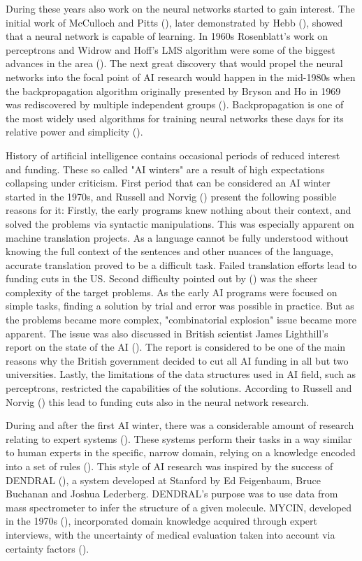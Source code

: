 \documentclass[utf8,english]{gradu3}
\begin{document}
During these years also work on the neural networks started to gain interest.
The initial work of McCulloch and Pitts (\cite*{mcculloch1943}), later
demonstrated by Hebb (\cite{norvig2002}), showed that a neural network is
capable of learning. In 1960s Rosenblatt's work on perceptrons and Widrow and
Hoff's LMS algorithm were some of the biggest advances in the area
(\cite{widrow1995}). The next great discovery that would propel the neural
networks into the focal point of AI research would happen in the mid-1980s when
the backpropagation algorithm originally presented by Bryson and Ho in 1969 was
rediscovered by multiple independent groups (\cite{norvig2002}). Backpropagation
is one of the most widely used algorithms for training neural networks these
days for its relative power and simplicity (\cite{rumelhart1995}).

History of artificial intelligence contains occasional periods of reduced
interest and funding. These so called "AI winters" are a result of high
expectations collapsing under criticism. First period that can be considered an
AI winter started in the 1970s, and Russell and Norvig (\cite*{norvig2002})
present the following possible reasons for it: Firstly, the early programs knew
nothing about their context, and solved the problems via syntactic
manipulations. This was especially apparent on machine translation projects. As
a language cannot be fully understood without knowing the full context of the
sentences and other nuances of the language, accurate translation proved to be a
difficult task. Failed translation efforts lead to funding cuts in the US.
Second difficulty pointed out by (\cite{norvig2002}) was the sheer complexity of
the target problems. As the early AI programs were focused on simple tasks,
finding a solution by trial and error was possible in practice. But as the
problems became more complex, "combinatorial explosion" issue became more
apparent. The issue was also discussed in British scientist James Lighthill's
report on the state of the AI (\cite*{lighthill1973}). The report is considered
to be one of the main reasons why the British government decided to cut all AI
funding in all but two universities. Lastly, the limitations of the data
structures used in AI field, such as perceptrons, restricted the capabilities of
the solutions. According to Russell and Norvig (\cite*{norvig2002}) this lead to
funding cuts also in the neural network research.

During and after the first AI winter, there was a considerable amount of
research relating to expert systems (\cite{norvig2002}). These systems perform
their tasks in a way similar to human experts in the specific, narrow domain,
relying on a knowledge encoded into a set of rules (\cite{myers1986}). This
style of AI research was inspired by the success of DENDRAL
(\cite{buchanan1968}), a system developed at Stanford by Ed Feigenbaum, Bruce
Buchanan and Joshua Lederberg. DENDRAL's purpose was to use data from mass
spectrometer to infer the structure of a given molecule. MYCIN, developed in the
1970s (\cite{shortliffe1975}), incorporated domain knowledge acquired through
expert interviews, with the uncertainty of medical evaluation taken into account
via certainty factors (\cite{norvig2002}).
\end{document}
